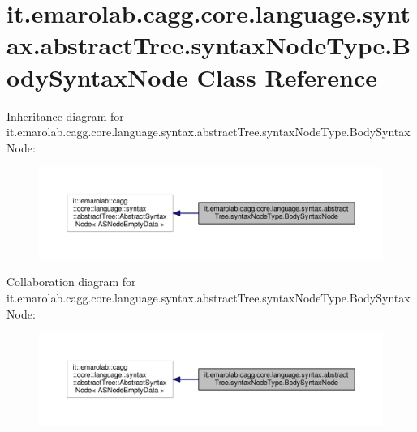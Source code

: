\hypertarget{classit_1_1emarolab_1_1cagg_1_1core_1_1language_1_1syntax_1_1abstractTree_1_1syntaxNodeType_1_1BodySyntaxNode}{\section{it.\-emarolab.\-cagg.\-core.\-language.\-syntax.\-abstract\-Tree.\-syntax\-Node\-Type.\-Body\-Syntax\-Node Class Reference}
\label{classit_1_1emarolab_1_1cagg_1_1core_1_1language_1_1syntax_1_1abstractTree_1_1syntaxNodeType_1_1BodySyntaxNode}
}


Inheritance diagram for it.\-emarolab.\-cagg.\-core.\-language.\-syntax.\-abstract\-Tree.\-syntax\-Node\-Type.\-Body\-Syntax\-Node\-:\nopagebreak
\begin{figure}[H]
\begin{center}
\leavevmode
\includegraphics[width=350pt]{classit_1_1emarolab_1_1cagg_1_1core_1_1language_1_1syntax_1_1abstractTree_1_1syntaxNodeType_1_1BodySyntaxNode__inherit__graph}
\end{center}
\end{figure}


Collaboration diagram for it.\-emarolab.\-cagg.\-core.\-language.\-syntax.\-abstract\-Tree.\-syntax\-Node\-Type.\-Body\-Syntax\-Node\-:\nopagebreak
\begin{figure}[H]
\begin{center}
\leavevmode
\includegraphics[width=350pt]{classit_1_1emarolab_1_1cagg_1_1core_1_1language_1_1syntax_1_1abstractTree_1_1syntaxNodeType_1_1BodySyntaxNode__coll__graph}
\end{center}
\end{figure}
